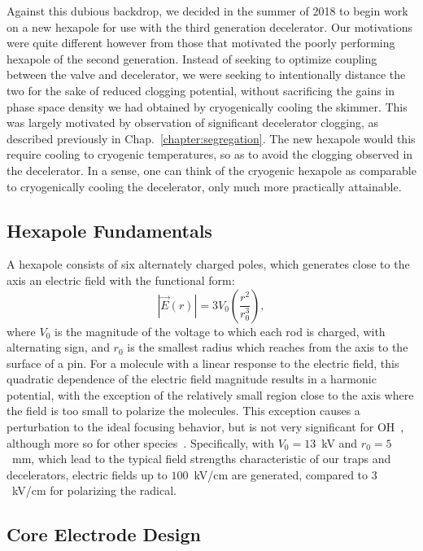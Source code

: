 Against this dubious backdrop, we decided in the summer of 2018 to begin work on a new hexapole for use with the third generation decelerator.
Our motivations were quite different however from those that motivated the poorly performing hexapole of the second generation.
Instead of seeking to optimize coupling between the valve and decelerator, we were seeking to intentionally distance the two for the sake of reduced clogging potential, without sacrificing the gains in phase space density we had obtained by cryogenically cooling the skimmer.
This was largely motivated by observation of significant decelerator clogging, as described previously in Chap.~\ref{chapter:segregation}.
The new hexapole would this require cooling to cryogenic temperatures, so as to avoid the clogging observed in the decelerator.
In a sense, one can think of the cryogenic hexapole as comparable to cryogenically cooling the decelerator, only much more practically attainable.

\subsection{Hexapole Fundamentals}

A hexapole consists of six alternately charged poles, which generates close to the axis an electric field with the functional form:
\begin{equation}
\left|\vec{E}(r)\right| = 3V_0\left(\frac{r^2}{r_0^3}\right),
\end{equation}
where $V_0$ is the magnitude of the voltage to which each rod is charged, with alternating sign, and $r_0$ is the smallest radius which reaches from the axis to the surface of a pin.
For a molecule with a linear response to the electric field, this quadratic dependence of the electric field magnitude results in a harmonic potential, with the exception of the relatively small region close to the axis where the field is too small to polarize the molecules.
This exception causes a perturbation to the ideal focusing behavior, but is not very significant for OH~\citep[Fig.~2b]{Bochinski2004}, although more so for other species~\citep[Fig.~1]{Kirste2013}.
Specifically, with $V_0=13$~kV and $r_0=5$~mm, which lead to the typical field strengths characteristic of our traps and decelerators, electric fields up to $100$~kV/cm are generated, compared to $3$~kV/cm for polarizing the radical.

\subsection{Core Electrode Design}

